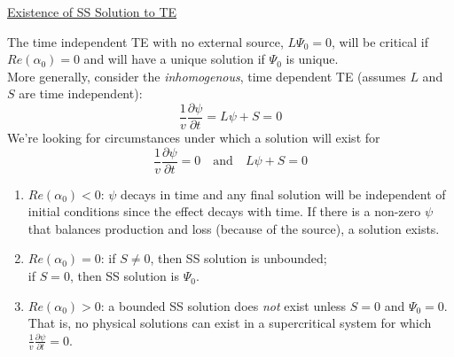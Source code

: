 \documentclass[12pt]{article}
\begin{document}
\vspace*{1 em}
\underline{Existence of SS Solution to TE}

The time independent TE with no external source, $L\Psi_0 = 0$, will be critical if $Re(\alpha_0) = 0$ and will have a unique solution if $\Psi_0$ is unique. \\
More generally, consider the \textit{inhomogenous}, time dependent TE (assumes $L$ and $S$ are time independent):
%
\[\frac{1}{v}\frac{\partial \psi}{\partial t} = L\psi + S = 0\]
%
We're looking for circumstances under which a solution will exist for
\[\frac{1}{v}\frac{\partial \psi}{\partial t} = 0 \quad \text{and} \quad L\psi + S = 0\]

\begin{enumerate}
\item $Re(\alpha_0) < 0$: $\psi$ decays in time and any final solution will be independent of initial conditions since the effect decays with time. If there is a non-zero $\psi$ that balances production and loss (because of the source), a solution exists.
\item $Re(\alpha_0) = 0$: if $S \neq 0$, then SS solution is unbounded; \\
\hspace*{5.5 em}if $S=0$, then SS solution is $\Psi_0$.
\item $Re(\alpha_0) > 0$: a bounded SS solution does \textit{not} exist unless $S=0$ and $\Psi_0 = 0$. That is, no physical solutions can exist in a supercritical system for which $\frac{1}{v}\frac{\partial \psi}{\partial t} = 0$.
\end{enumerate}
\end{document}
